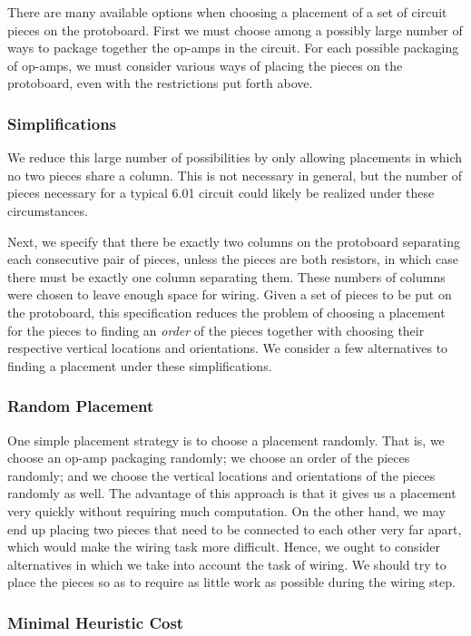 There are many available options when choosing a placement of a set of circuit
pieces on the protoboard.
First we must choose among a possibly large number of ways
to package together the op-amps in the circuit.
For each possible packaging of
op-amps, we must consider various ways of placing the pieces on the protoboard,
even with the restrictions put forth above.

\subsubsection{Simplifications}

We reduce this large number of possibilities by only allowing placements in
which no
two pieces share a column. This is not necessary in general, but the
number of pieces necessary for a typical 6.01 circuit could likely be realized
under these circumstances.

Next, we specify that there be exactly two columns on the protoboard separating
each consecutive pair of pieces, unless the pieces are both resistors, in which
case there must be exactly one column separating them. These numbers of columns
were chosen to leave enough space for wiring. Given a set of pieces to be put on
the protoboard, this specification reduces the
problem of choosing a placement for the pieces to finding an \emph{order} of the
pieces together with choosing their respective vertical locations and
orientations. We consider a few alternatives to finding a placement under these
simplifications.

\subsubsection{Random Placement}

One simple placement strategy is to choose a placement randomly.
That is, we choose
an op-amp packaging randomly; we choose an order of the pieces randomly; and we
choose the vertical locations and orientations of the pieces randomly as well.
The advantage of this
approach is that it gives us a placement very quickly without requiring much
computation. On the other hand, we may end up placing two pieces that need to be
connected to each other very far apart, which would make the wiring task more
difficult. Hence, we ought to consider alternatives in which we take into
account the task of wiring. We should try to place the pieces so as to require
as little work as possible during the wiring step.

\subsubsection{Minimal Heuristic Cost}


